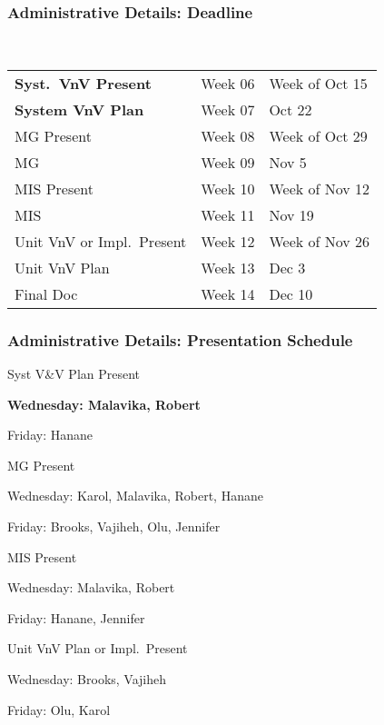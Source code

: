 \documentclass[t,12pt,numbers,fleqn]{beamer}
\begin{document}



\begin{frame}
\frametitle{Administrative Details: Deadline}

~\newline
\begin{tabular}{l l l}
\textbf{Syst.\ VnV Present} & Week 06 & Week of Oct 15\\
\textbf{System VnV Plan} & Week 07 & Oct 22\\
MG Present & Week 08 & Week of Oct 29\\
MG & Week 09 & Nov 5\\
MIS Present & Week 10 & Week of Nov 12\\
MIS & Week 11 & Nov 19\\
Unit VnV or Impl.\ Present & Week 12 & Week of Nov 26\\
Unit VnV Plan & Week 13 & Dec 3\\
Final Doc & Week 14 & Dec 10\\
\end {tabular}

\end{frame}


\begin{frame}
\frametitle{Administrative Details: Presentation Schedule}

\bi
\item Syst V\&V Plan Present
\bi
\item \textbf{Wednesday: Malavika, Robert}
\item Friday: Hanane
\ei
\item MG Present
\bi
\item Wednesday: Karol, Malavika, Robert, Hanane
\item Friday: Brooks, Vajiheh, Olu, Jennifer
\ei
\item MIS Present
\bi
\item Wednesday: Malavika, Robert
\item Friday: Hanane,  Jennifer
\ei
\item Unit VnV Plan or Impl.\ Present
\bi
\item Wednesday: Brooks, Vajiheh
\item Friday: Olu, Karol
\ei

\ei

\end{frame}
\end{document}
